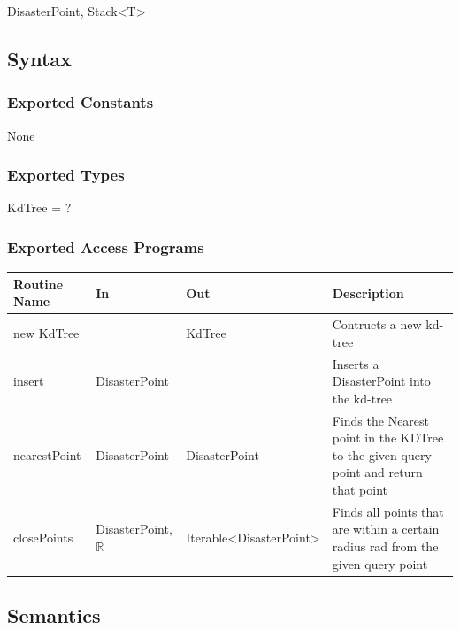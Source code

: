 \documentclass[12pt]{article}
\begin{document}
                DisasterPoint, Stack<T>
                
                \subsection* {Syntax}
                
                \subsubsection* {Exported Constants}
                
                None
                
                \subsubsection* {Exported Types}
                
                KdTree = ?

                \subsubsection* {Exported Access Programs}
                
                \begin{tabular}{| l | l | l | p{5cm} |}
                    \hline
                    \textbf{Routine Name} & \textbf{In} & \textbf{Out} & \textbf{Description}\\
                    \hline
                    new KdTree & & KdTree & Contructs a new kd-tree\\
                    \hline
                    insert & DisasterPoint & ~ & Inserts a DisasterPoint into the kd-tree\\
                    \hline
                    nearestPoint & DisasterPoint & DisasterPoint & Finds the Nearest point in the KDTree to the given query point and return that point\\
                    \hline
                    closePoints & DisasterPoint, $\mathbb{R}$ & Iterable<DisasterPoint> & Finds all points that are within a certain radius rad from the given query point\\
                    \hline
                \end{tabular}
                \subsection* {Semantics}
                
\end{document}
